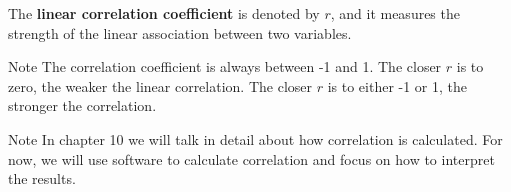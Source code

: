 \documentclass{beamer}
\begin{document}
\begin{frame}
\begin{definition}
The \textbf{linear correlation coefficient} is denoted by $r$, and it measures the strength of the linear association between two variables.
\end{definition}\pause

\begin{block}{Note}
The correlation coefficient is always between -1 and 1. The closer $r$ is to zero, the weaker the linear correlation. The closer $r$ is to either -1 or 1, the stronger the correlation.
\end{block}\pause

\begin{block}{Note}
In chapter 10 we will talk in detail about how correlation is calculated. For now, we will use software to calculate correlation and focus on how to interpret the results.
\end{block}
\end{frame}
\end{document}
